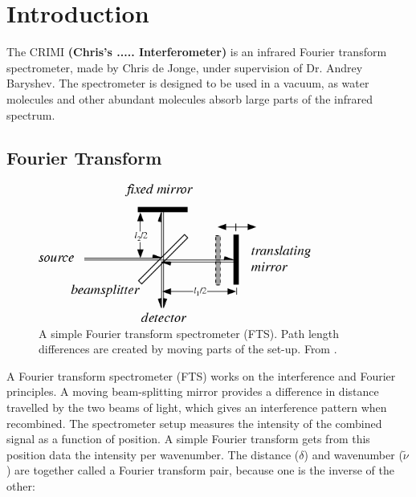 
\section{Introduction}
The CRIMI \textbf{(Chris's ..... Interferometer)} is an infrared Fourier transform spectrometer, made by Chris de Jonge, under supervision of Dr. Andrey Baryshev. The spectrometer is designed to be used in a vacuum, as water molecules and other abundant molecules absorb large parts of the infrared spectrum.


\subsection{Fourier Transform}

\begin{figure}
 \begin{center}
  \includegraphics[width=0.8\textwidth]{figures/fts.png}
  \caption{A simple Fourier transform spectrometer (FTS). Path length differences are created by moving parts of the set-up.  From \cite{wolf}.}
  \label{fig:fts}
 \end{center}
\end{figure}

A Fourier transform spectrometer (FTS) works on the interference and Fourier principles. A moving beam-splitting mirror provides a difference in distance travelled by the two beams of light, which gives an interference pattern when recombined. The spectrometer setup measures the intensity of the combined signal as a function of position. A simple Fourier transform gets from this position data the intensity per wavenumber. The distance ($\delta$) and wavenumber ($\tilde{\nu}$) are together called a Fourier transform pair, because one is the inverse of the other:

